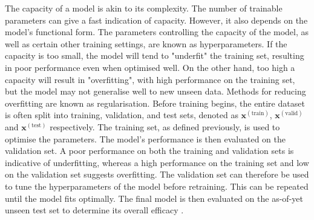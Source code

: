 \documentclass[12pt]{article}
\begin{document}
The capacity of a model is akin to its complexity. The number of trainable parameters can give a fast indication of capacity. However, it also depends on the model's functional form. The parameters controlling the capacity of the model, as well as certain other training settings, are known as hyperparameters. If the capacity is too small, the model will tend to "underfit" the training set, resulting in poor performance even when optimised well. On the other hand, too high a capacity will result in "overfitting", with high performance on the training set, but the model may not generalise well to new unseen data. Methods for reducing overfitting are known as regularisation. Before training begins, the entire dataset is often split into training, validation, and test sets, denoted as $\mathbf{x}^{(\textrm{train})}$, $\mathbf{x}^{(\textrm{valid})}$ and $\mathbf{x}^{(\textrm{test})}$ respectively. The training set, as defined previously, is used to optimise the parameters. The model's performance is then evaluated on the validation set. A poor performance on both the training and validation sets is indicative of underfitting, whereas a high performance on the training set and low on the validation set suggests overfitting. The validation set can therefore be used to tune the hyperparameters of the model before retraining. This can be repeated until the model fits optimally. The final model is then evaluated on the as-of-yet unseen test set to determine its overall efficacy \cite{Goodfellow16}.
\end{document}
